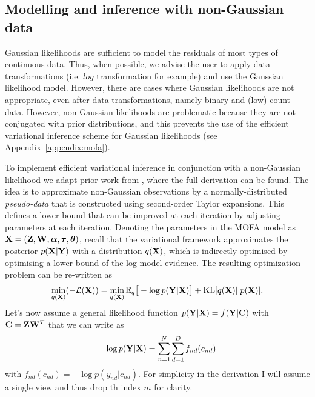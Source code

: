 \subsection{Modelling and inference with non-Gaussian data} \label{section:mofa_ngaussian}

Gaussian likelihoods are sufficient to model the residuals of most types of continuous data. Thus, when possible, we advise the user to apply data transformations (i.e. $log$ transformation for example) and use the Gaussian likelihood model. However, there are cases where Gaussian likelihoods are not appropriate, even after data transformations, namely binary and (low) count data. However, non-Gaussian likelihoods are problematic because they are not conjugated with prior distributions, and this prevents the use of the efficient variational inference scheme for Gaussian likelihoods (see Appendix~\ref{appendix:mofa}).

To implement efficient variational inference in conjunction with a non-Gaussian likelihood we adapt prior work from \cite{Seeger2012}, where the full derivation can be found. The idea is to approximate non-Gaussian observations by a normally-distributed \textit{pseudo-data} that is constructed using second-order Taylor expansions. This defines a lower bound that can be improved at each iteration by adjusting parameters at each iteration. Denoting the parameters in the MOFA model as ${\bf X}= ({\bf Z},{\bf W},\mbox{\boldmath $\alpha$},\mbox{\boldmath $\tau$},\mbox{\boldmath $\theta$})$, recall that the variational framework approximates the posterior $p({\bf X} | {\bf Y} )$ with a distribution $q({\bf X})$, which is indirectly optimised by optimising a lower bound of the log model evidence. The resulting optimization problem can be re-written as
\begin{equation*}
\min_{q({\bf X})} (-\mathcal{L}({\bf X})) =  \min_{q({\bf X})} \mathbb{E}_q \big[ -\log p({\bf Y}|{\bf X}) \big] + {\rm KL}[q({\bf X})||p({\bf X})].
\end{equation*}
Let's now assume a general likelihood function $p({\bf Y}|{\bf X})=f({\bf Y}|{\bf C})$ with ${\bf C} = {\bf Z}{\bf W}^{T}$ that we can write as
\begin{equation*}
-\log p({\bf Y}|{\bf X}) = \sum_{n=1}^{N} \sum_{d=1}^{D} f_{nd} (c_{nd})
\end{equation*}
with $f_{nd}(c_{nd}) = -\log p(y_{nd}|c_{nd})$. For simplicity in the derivation I will assume a single view and thus drop th index $m$ for clarity.

